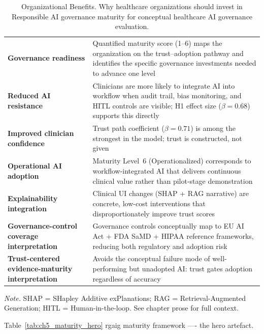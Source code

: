 {\tablestripes\tablefontsize
{}
\begin{xltabular}{\textwidth}{@{} >{\raggedright\arraybackslash}p{2.8cm} L @{}}
\caption[Organizational Benefits]{Organizational Benefits. Why healthcare organizations should invest in Responsible AI governance maturity for conceptual healthcare AI governance evaluation.}\label{tab:ch5_org_benefits} \\
\toprule
{} &  \\
\midrule
\endfirsthead
\endhead
\bottomrule
\endlastfoot
\textbf{Governance readiness}     & Quantified maturity score (1--6) maps the organization on the trust--adoption pathway and identifies the specific governance investments needed to advance one level \\
\textbf{Reduced AI resistance}    & Clinicians are more likely to integrate AI into workflow when audit trail, bias monitoring, and HITL controls are visible; H1 effect size ($\beta=0.68$) supports this directly \\
\textbf{Improved clinician confidence} & Trust path coefficient ($\beta=0.71$) is among the strongest in the model; trust is constructed, not given \\
\textbf{Operational AI adoption}  & Maturity Level~6 (Operationalized) corresponds to workflow-integrated AI that delivers continuous clinical value rather than pilot-stage demonstration \\
\textbf{Explainability integration} & Clinical UI changes (SHAP + RAG narrative) are concrete, low-cost interventions that disproportionately improve trust scores \\
\textbf{Governance-control coverage interpretation}        & Governance controls conceptually map to EU AI Act + FDA SaMD + HIPAA reference frameworks, reducing both regulatory and adoption risk \\
\textbf{Trust-centered evidence-maturity interpretation} & Avoids the conceptual failure mode of well-performing but unadopted AI: trust gates adoption regardless of accuracy \\
\end{xltabular}}
\vspace{0.3em}\noindent\textit{Note.} SHAP = SHapley Additive exPlanations; RAG = Retrieval-Augmented Generation; HITL = Human-in-the-loop. See chapter prose for full context.

\noindent Table~\ref{tab:ch5_maturity_hero} rgaig maturity framework ---- the hero artefact.

